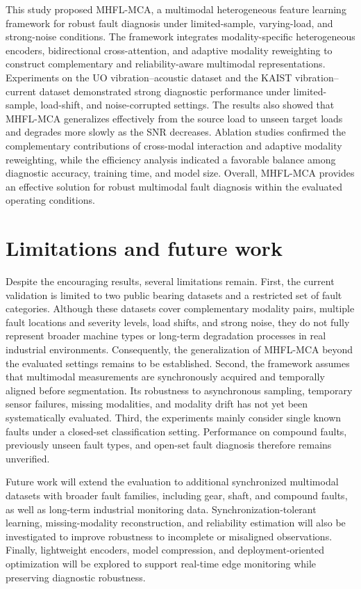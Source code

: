 \documentclass[a4paper]{cas-sc}
\begin{document}
This study proposed MHFL-MCA, a multimodal heterogeneous feature learning framework for robust fault diagnosis under limited-sample, varying-load, and strong-noise conditions. The framework integrates
modality-specific heterogeneous encoders, bidirectional
cross-attention, and adaptive modality reweighting to construct complementary and reliability-aware multimodal representations. Experiments on the UO vibration--acoustic dataset and the KAIST
vibration--current dataset demonstrated strong diagnostic performance under limited-sample, load-shift, and noise-corrupted settings. The results also showed that MHFL-MCA generalizes effectively from the source load to unseen target loads and degrades more slowly as the SNR decreases. Ablation studies confirmed the complementary contributions of cross-modal interaction and adaptive modality reweighting, while the efficiency analysis indicated a
favorable balance among diagnostic accuracy, training time, and model size. Overall, MHFL-MCA provides an effective solution for robust multimodal fault diagnosis within the evaluated operating conditions.

\section{Limitations and future work}
\label{sec:limitations}

Despite the encouraging results, several limitations remain. First, the current validation is limited to two public bearing datasets and a restricted set of fault categories. Although these datasets cover complementary modality pairs, multiple fault locations and severity levels, load shifts, and strong noise, they do not fully represent broader machine types or long-term degradation processes in real industrial environments. Consequently, the generalization
of MHFL-MCA beyond the evaluated settings remains to be
established. Second, the framework assumes that multimodal measurements are synchronously acquired and temporally aligned before segmentation. Its robustness to asynchronous sampling, temporary sensor failures, missing modalities, and modality drift has not yet been systematically evaluated. Third, the experiments
mainly consider single known faults under a closed-set
classification setting. Performance on compound faults, previously unseen fault types, and open-set fault diagnosis therefore remains unverified.

Future work will extend the evaluation to additional synchronized multimodal datasets with broader fault families, including gear, shaft, and compound faults, as well as long-term industrial monitoring data. Synchronization-tolerant learning, missing-modality reconstruction, and reliability estimation will
also be investigated to improve robustness to incomplete or misaligned observations. Finally, lightweight encoders, model compression, and deployment-oriented optimization will be explored
to support real-time edge monitoring while preserving diagnostic robustness.
\end{document}
